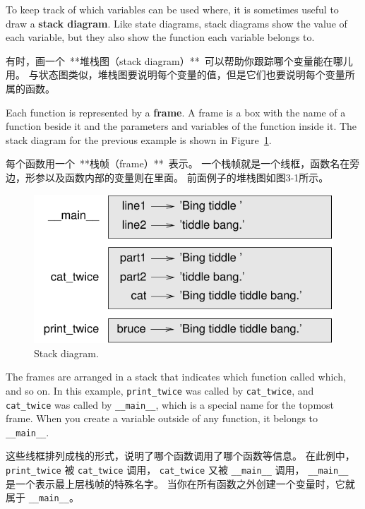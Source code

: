 To keep track of which variables can be used where, it is sometimes
useful to draw a {\bf stack diagram}.  Like state diagrams, stack
diagrams show the value of each variable, but they also show the
function each variable belongs to.
  

有时，画一个\ **堆栈图（stack diagram）**\ 可以帮助你跟踪哪个变量能在哪儿用。
与状态图类似，堆栈图要说明每个变量的值，但是它们也要说明每个变量所属的函数。


Each function is represented by a {\bf frame}.  A frame is a box with
the name of a function beside it and the parameters and variables of
the function inside it.  The stack diagram for the previous example is
shown in Figure~\ref{fig.stack}.

每个函数用一个\ **栈帧（frame）**\ 表示。
一个栈帧就是一个线框，函数名在旁边，形参以及函数内部的变量则在里面。
前面例子的堆栈图如图3-1所示。

\begin{figure}
\centerline
{\includegraphics[scale=0.8]{../source/figs/stack.pdf}}
\caption{Stack diagram.}
\label{fig.stack}
\end{figure}

The frames are arranged in a stack that indicates which function
called which, and so on.  In this example, \verb"print_twice"
was called by \verb"cat_twice", and \verb"cat_twice" was called by
\verb"__main__", which is a special name for the topmost frame.  When
you create a variable outside of any function, it belongs to
\verb"__main__".

这些线框排列成栈的形式，说明了哪个函数调用了哪个函数等信息。
在此例中，\lstinline{print_twice} 被 \lstinline{cat_twice} 调用，
\lstinline{cat_twice} 又被 \lstinline{__main__} 调用， \lstinline{__main__} 是一个表示最上层栈帧的特殊名字。
当你在所有函数之外创建一个变量时，它就属于 \lstinline{__main__}。

